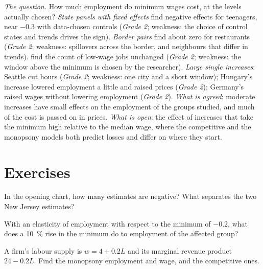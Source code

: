 \begin{debate}
\emph{The question.} How much employment do minimum wages cost, at the levels
actually chosen?
\emph{State panels with fixed effects} find negative effects for teenagers, near $-0.3$
with data-chosen controls (\emph{Grade 2}; weakness: the choice of control states and
trends drives the sign). %
\emph{Border pairs} find about zero for restaurants (\emph{Grade 2}; weakness: spillovers
across the border, and neighbours that differ in trends). %
\emph{} find the count of low-wage jobs unchanged (\emph{Grade 2};
weakness: the window above the minimum is chosen by the researcher). %
\emph{Large single increases}: Seattle cut hours (\emph{Grade 2}; weakness: one city
and a short window); %
Hungary's increase lowered employment a little and raised prices (\emph{Grade 2}); %
Germany's raised wages without lowering employment (\emph{Grade 2}). %
\emph{What is agreed}: moderate increases have small effects on the employment of
the groups studied, and much of the cost is passed on in prices. \emph{What is
open}: the effect of increases that take the minimum high relative to the median
wage, where the competitive and the monopsony models both predict losses and
differ on where they start.
\end{debate}

\section{Exercises}\label{sec:b3:minimum-wage:exercises}

\begin{exercise}[$\star$]\label{exo:b3:minimum-wage:1}
In the opening chart, how many estimates are negative? What separates the two New
Jersey estimates?
\end{exercise}

\begin{exercise}[$\star$]\label{exo:b3:minimum-wage:2}
With an elasticity of employment with respect to the minimum of $-0.2$, what does a 10~\% rise
in the minimum do to employment of the affected group?
\end{exercise}

\begin{exercise}[$\star$]\label{exo:b3:minimum-wage:3}
A firm's labour supply is $w = 4 + 0.2L$ and its marginal revenue product $24 - 0.2L$. Find the
monopsony employment and wage, and the competitive ones.
\end{exercise}

